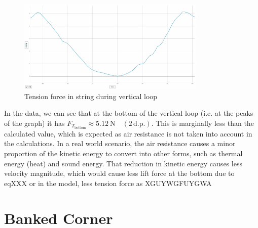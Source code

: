 \documentclass[11pt, a4paper]{article}
\begin{document}
	\begin{figure}[H]
		\centering
		\includegraphics[width=0.8\textwidth]{Images/Tension at Bottom}
		\caption{Tension force in string during vertical loop}
	\end{figure}
	In the data, we can see that at the bottom of the vertical loop (i.e. at the peaks of the graph) it has $F_{T_\text{bottom}}\approx \SI{5.12}{\newton} \quad (2\, \text{d.p.})$. This is marginally less than the calculated value, which is expected as air resistance is not taken into account in the calculations. In a real world scenario, the air resistance causes a minor proportion of the kinetic energy to convert into other forms, such as thermal energy (heat) and sound energy. That reduction in kinetic energy causes less velocity magnitude, which would cause less lift force at the bottom due to eqXXX or in the model, less tension force as XGUYWGFUYGWA
	
	\section{Banked Corner}
\end{document}
